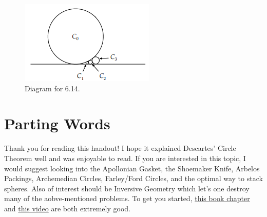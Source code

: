\documentclass{article}
\begin{document}
\begin{figure}[ht]
\centering
\includegraphics[width=.5\textwidth]{6.14.png}
\caption{Diagram for 6.14.}
\end{figure}

\section{Parting Words}

Thank you for reading this handout! I hope it explained Descartes' Circle Theorem well and was enjoyable to read. If you are interested in this topic, I would suggest looking into the Apollonian Gasket, the Shoemaker Knife, Arbelos Packings, Archemedian Circles, Farley/Ford Circles, and the optimal way to stack spheres. Also of interest should be Inversive Geometry which let's one destroy many of the aobve-mentioned problems. To get you started, \href{https://www.maa.org/sites/default/files/pdf/ebooks/pdf/EGMO_chapter8.pdf}{this book chapter} and \href{https://www.youtube.com/watch?v=CROeIGfr3gs}{this video} are both extremely good. 
\end{document}
